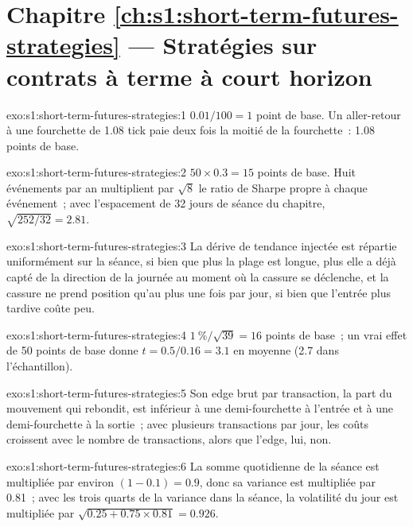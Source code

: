 \section*{Chapitre \ref{ch:s1:short-term-futures-strategies} --- Stratégies sur contrats à terme à court horizon}

\begin{solution}{exo:s1:short-term-futures-strategies:1}
$0.01/100 = 1$ point de base. Un aller-retour à une fourchette de 1.08 tick paie deux fois la moitié de la fourchette~: 1.08 points de base.
\end{solution}

\begin{solution}{exo:s1:short-term-futures-strategies:2}
$50 \times 0.3 = 15$ points de base. Huit événements par an multiplient par $\sqrt{8}$ le ratio de Sharpe propre à chaque événement~; avec l'espacement de 32 jours de séance du chapitre,
$\sqrt{252/32} = 2.81$.
\end{solution}

\begin{solution}{exo:s1:short-term-futures-strategies:3}
La dérive de tendance injectée est répartie uniformément sur la séance, si bien que plus la plage est longue, plus elle a déjà capté de la direction de la journée au moment où la cassure
se déclenche, et la cassure ne prend position qu'au plus une fois par jour, si bien que l'entrée plus tardive coûte peu.
\end{solution}

\begin{solution}{exo:s1:short-term-futures-strategies:4}
$1~\%/\sqrt{39} = 16$ points de base~; un vrai effet de 50 points de base donne $t = 0.5/0.16 = 3.1$ en moyenne (2.7 dans l'échantillon).
\end{solution}

\begin{solution}{exo:s1:short-term-futures-strategies:5}
Son edge brut par transaction, la part du mouvement qui rebondit, est inférieur à une demi-fourchette à l'entrée et à une demi-fourchette à la sortie~; avec plusieurs transactions par jour, les
coûts croissent avec le nombre de transactions, alors que l'edge, lui, non.
\end{solution}

\begin{solution}{exo:s1:short-term-futures-strategies:6}
La somme quotidienne de la séance est multipliée par environ $(1 - 0.1) = 0.9$, donc sa variance est multipliée par 0.81~; avec les trois quarts de la variance dans la séance, la
volatilité du jour est multipliée par $\sqrt{0.25 + 0.75 \times 0.81} = 0.926$.
\end{solution}

